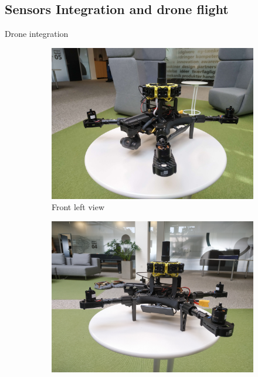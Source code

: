 \subsection{Sensors Integration and drone flight}
Drone integration
\begin{figure}[H]
    \centering
    \begin{subfigure}[b]{0.475\textwidth}
        \centering
        \includegraphics[width=\textwidth]{./projects/logviewer/drone_fl_view.jpg}
        \caption{Front left view}
    \end{subfigure}
    \hfill
    \begin{subfigure}[b]{0.475\textwidth}  
        \centering 
        \includegraphics[width=\textwidth]{./projects/logviewer/drone_l_view.jpg}

\end{subfigure}
\end{figure}
